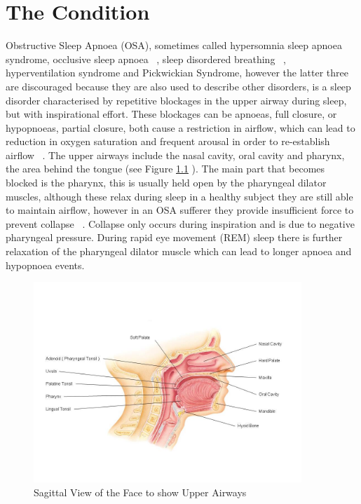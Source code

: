 \chapter{The Condition}
\label{ch:medicalInfo}
Obstructive Sleep Apnoea (OSA), sometimes called hypersomnia sleep apnoea syndrome, occlusive sleep apnoea ~\cite{whitelaw1993characteristics}, sleep disordered breathing ~\cite{sleepdisorderedbreathing}, hyperventilation syndrome and Pickwickian Syndrome, however the latter three are discouraged because they are also used to describe other disorders, is a sleep disorder characterised by repetitive blockages in the upper airway during sleep, but with inspirational effort. These blockages can be apnoeas, full closure, or hypopnoeas, partial closure, both cause a restriction in airflow, which can lead to reduction in oxygen saturation and frequent arousal in order to re-establish airflow ~\cite{american2001international}.
The upper airways include the nasal cavity, oral cavity and pharynx, the area behind the tongue (see Figure \ref{fig:Sagittal-Face} ). The main part that becomes blocked is the pharynx, this is usually held open by the pharyngeal dilator muscles, although these relax during sleep in a healthy subject they are still able to maintain airflow, however in an OSA sufferer they provide insufficient force to prevent collapse ~\cite{fogel2004sleep}. Collapse only occurs during inspiration and is due to negative pharyngeal pressure. During rapid eye movement (REM) sleep there is further relaxation of the pharyngeal dilator muscle which can lead to longer apnoea and hypopnoea events. 
\begin{figure}[h]
\centering
\includegraphics[width=0.9\textwidth]{drawings/Sagittal-Face}
\caption{Sagittal View of the Face to show Upper Airways ~\cite{sagittalface}}
\label{fig:Sagittal-Face}
\end{figure}

